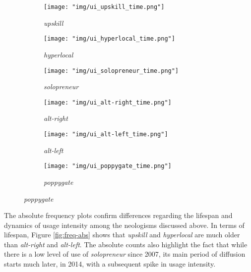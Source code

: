 \documentclass[
  a4paper,
  abstract=on,
  captions=tableabove,
  ]{scrartcl}
\newcommand{\ol}[1]{\emph{#1}}
\begin{document}
      \begin{figure}
        \caption[Temporal dynamics in absolute usage frequency]{Temporal dynamics in usage frequency for the selected neologisms.}
        \label{fig:freq-abs}
        \centering
        \begin{subfigure}{.3\linewidth}
          \caption{\ol{upskill}}
          \label{subfig:freq_temp_upskill}
          \texttt{[image: "img/ui\_upskill\_time.png"]}
        \end{subfigure}
        \hfill
        \begin{subfigure}{.3\linewidth}
          \caption{\ol{hyperlocal}}
          \label{subfig:freq_temp_hyperlocal}
          \texttt{[image: "img/ui\_hyperlocal\_time.png"]}
        \end{subfigure}
        \hfill
        \begin{subfigure}{.3\linewidth}
          \caption{\ol{solopreneur}}
          \label{subfig:freq_temp_solopreneur}
          \texttt{[image: "img/ui\_solopreneur\_time.png"]}
        \end{subfigure}

        \begin{subfigure}{.3\linewidth}
          \caption{\ol{alt-right}}
          \label{subfig:freq_temp_alt-right}
          \texttt{[image: "img/ui\_alt-right\_time.png"]}
        \end{subfigure}
        \hfill
        \begin{subfigure}{.3\linewidth}
          \caption{\ol{alt-left}}
          \label{subfig:freq_temp_alt-left}
          \texttt{[image: "img/ui\_alt-left\_time.png"]}
        \end{subfigure}
        \hfill
        \begin{subfigure}{.3\linewidth}
          \caption{\ol{poppygate}}
          \label{subfig:freq_temp_poppygate}
          \texttt{[image: "img/ui\_poppygate\_time.png"]}
        \end{subfigure}
      \end{figure}

      The absolute frequency plots confirm differences regarding the lifespan and dynamics of usage intensity among the neologisms discussed above. In terms of lifespan, Figure \ref{fig:freq-abs} shows that \ol{upskill} and \ol{hyperlocal} are much older than \ol{alt-right} and \ol{alt-left}. The absolute counts also highlight the fact that while there is a low level of use of \ol{solopreneur} since 2007, its main period of diffusion starts much later, in 2014, with a subsequent spike in usage intensity.
\end{document}
